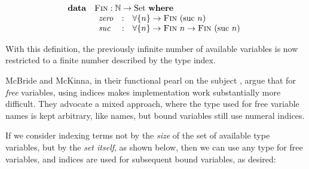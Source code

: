 \documentclass[a4paper]{jfp}
\begin{document}
\begin{displaymath}   
	\begin{array}{ll}
		\textbf{data} & \textsc{Fin} : \mathbb{N} \rightarrow \text{Set}\ \textbf{where} \\
		              & \begin{array}{lcl}
                         \mathit{zero} & : & \forall \{ n \} \rightarrow \textsc{Fin}\ (\text{suc}\ n)\\
                         \mathit{suc}  & : & \forall \{ n \} \rightarrow \textsc{Fin}\ n \rightarrow \textsc{Fin}\ (\text{suc}\ n)\\
			  		       \end{array}
     \end{array}
\end{displaymath}	 



With this definition, the previously infinite number of available variables is now restricted to a finite number described by the type index.
 
McBride and McKinna, in their functional pearl on the subject \cite{McBride:2004:FPI:1017472.1017477}, argue that for \emph{free} variables, using indices makes implementation work substantially more difficult. They advocate a mixed approach, where the type used for free variable names is kept arbitrary, like names, but bound variables still use numeral indices. 

If we consider indexing terms not by the \emph{size} of the set of available type variables, but by the \emph{set itself}, as shown below, then we can use any type for free variables, and indices are used for subsequent bound variables, as desired:
\end{document}
